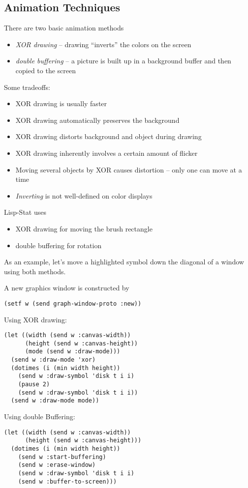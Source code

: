 \begin{slide}{}
\subsection{Animation Techniques}
There are two basic animation methods
\begin{itemize}
\item
{\em XOR drawing} -- drawing ``inverts'' the colors on the screen
\item
{\em double buffering} -- a picture is built up in a background
buffer and then copied to the screen
\end{itemize}
Some tradeoffs:
\begin{itemize}
\item
XOR drawing is usually faster
\item
XOR drawing automatically preserves the background
\item
XOR drawing distorts background and object during drawing
\item
XOR drawing inherently involves a certain amount of flicker
\item
Moving several objects by XOR causes distortion -- only one can
move at a time
\item
{\em Inverting}\/ is not well-defined on color displays
\end{itemize}
\end{slide}

\begin{slide}{}
Lisp-Stat uses
\begin{itemize}
\item XOR drawing for moving the brush rectangle
\item double buffering for rotation
\end{itemize}

As an example, let's move a highlighted symbol down the diagonal
of a window using both methods.

A new graphics window is constructed by
{\Large
\begin{verbatim}
(setf w (send graph-window-proto :new))
\end{verbatim}}
\end{slide}

\begin{slide}{}
Using XOR drawing:
{\Large
\begin{verbatim}
(let ((width (send w :canvas-width))
      (height (send w :canvas-height))
      (mode (send w :draw-mode)))
  (send w :draw-mode 'xor)
  (dotimes (i (min width height))
    (send w :draw-symbol 'disk t i i)
    (pause 2)
    (send w :draw-symbol 'disk t i i))
  (send w :draw-mode mode))
\end{verbatim}}
Using double Buffering:
{\Large
\begin{verbatim}
(let ((width (send w :canvas-width))
      (height (send w :canvas-height)))
  (dotimes (i (min width height))
    (send w :start-buffering)
    (send w :erase-window)
    (send w :draw-symbol 'disk t i i)
    (send w :buffer-to-screen)))
\end{verbatim}}
\end{slide}

